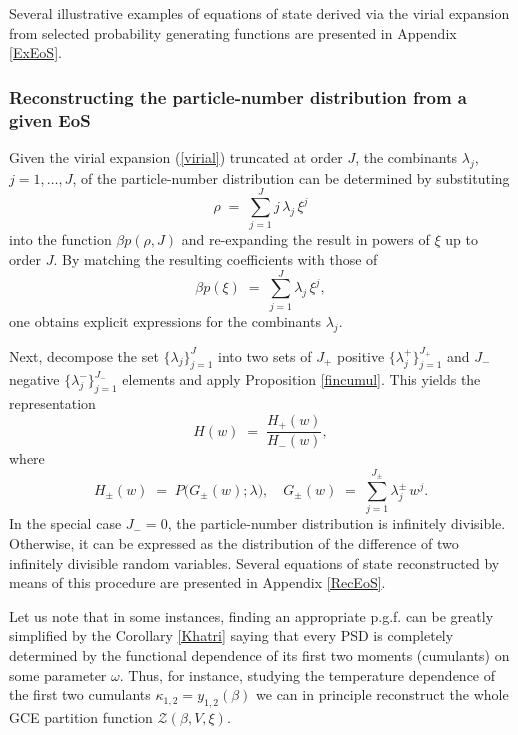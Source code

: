 \documentclass[a4paper,12pt]{amsart}
\theoremstyle{definition}
\theoremstyle{remark}
\begin{document}
Several illustrative examples of equations of state derived via the virial expansion from selected probability generating functions are presented in Appendix \ref{ExEoS}.


\subsubsection{Reconstructing the particle-number distribution from a given  EoS} 
Given the virial expansion (\ref{virial}) truncated at order $J$, the combinants $\lambda_j$, $j = 1, \ldots, J$, of the particle-number distribution can be determined by substituting
\[
\rho \;=\; \sum_{j=1}^{J} j\,\lambda_j\,\xi^j
\]
into the function $\beta p(\rho, J)$ and re-expanding the result in powers of $\xi$ up to order $J$. By matching the resulting coefficients with those of
\[
\beta p(\xi) \;=\; \sum_{j=1}^{J} \lambda_j\,\xi^j,
\]
one obtains explicit expressions for the combinants $\lambda_j$.  

Next, decompose the set $\{\lambda_j\}_{j=1}^J$ into two sets of $J_{+}$ positive $\{\lambda_j^{+}\}_{j=1}^{J_{+}}$ and $J_{-}$ negative $\{\lambda_j^{-}\}_{j=1}^{J_{-}}$ elements and apply Proposition \ref{fincumul}. This yields the representation
\[
H(w) \;=\; \frac{H_{+}(w)}{H_{-}(w)},
\]
where
\[
H_{\pm}(w) \;=\; P\bigl(G_{\pm}(w); \lambda\bigr), 
\quad
G_{\pm}(w) \;=\; \sum_{j=1}^{J_{\pm}} \lambda_j^{\pm}\,w^j.
\]
In the special case $J_{-}=0$, the particle-number distribution is infinitely divisible. Otherwise, it can be expressed as the distribution of the difference of two infinitely divisible random variables. Several equations of state reconstructed by means of this procedure are presented in Appendix \ref{RecEoS}.

Let us note that in some instances, finding an appropriate p.g.f. can be greatly simplified by the Corollary \ref{Khatri} 
saying that every PSD is completely determined by the functional dependence of its first two moments (cumulants) on some parameter $\omega$.
Thus, for instance, studying the temperature dependence of the first two cumulants $\kappa_{1,2}=y_{1,2}(\beta)$ we can in principle reconstruct the whole GCE partition function $\mathcal{Z}(\beta, V, \xi)$.
\end{document}
